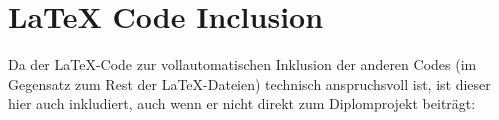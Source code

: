 \section{LaTeX Code Inclusion}
\label{lstsec:incl-latex}
Da der LaTeX-Code zur vollautomatischen Inklusion der anderen Codes (im Gegensatz zum Rest der LaTeX-Dateien)
technisch anspruchsvoll ist,
ist dieser hier auch inkludiert,
auch wenn er nicht direkt zum Diplomprojekt beiträgt:

